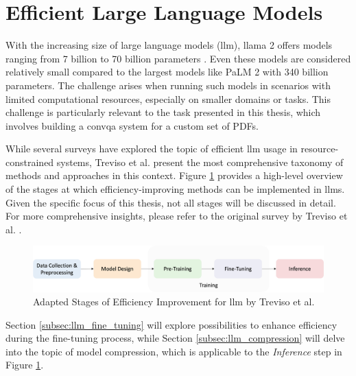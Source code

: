 \section{Efficient Large Language Models}
\label{sec:efficient_llm}

With the increasing size of large language models (\gls{llm}), \gls{llama} 2 offers models ranging from 7 billion to 70 billion parameters \cite{touvron_llama_2023}. Even these models are considered relatively small compared to the largest models like PaLM 2 \cite{anil_palm_2023} with 340 billion parameters. The challenge arises when running such models in scenarios with limited computational resources, especially on smaller domains or tasks. This challenge is particularly relevant to the task presented in this thesis, which involves building a \gls{convqa} system for a custom set of PDFs.

While several surveys \cite{ling_domain_2023, zhao_survey_2023} have explored the topic of efficient \gls{llm} usage in resource-constrained systems, Treviso et al. \cite{treviso_efficient_2023} present the most comprehensive taxonomy of methods and approaches in this context. Figure \ref{fig:llm_taxonomy} provides a high-level overview of the stages at which efficiency-improving methods can be implemented in \gls{llm}s. Given the specific focus of this thesis, not all stages will be discussed in detail. For more comprehensive insights, please refer to the original survey by Treviso et al. \cite{treviso_efficient_2023}.

\begin{figure}
    \centering
    \includegraphics[width=\textwidth]{Grafiken/Efficient_Survey_Steps.png}
    \caption{Adapted Stages of Efficiency Improvement for \gls{llm} by Treviso et al. \cite{treviso_efficient_2023}}
    \label{fig:llm_taxonomy}
\end{figure}

Section \ref{subsec:llm_fine_tuning} will explore possibilities to enhance efficiency during the fine-tuning process, while Section \ref{subsec:llm_compression} will delve into the topic of model compression, which is applicable to the \textit{Inference} step in Figure \ref{fig:llm_taxonomy}.



